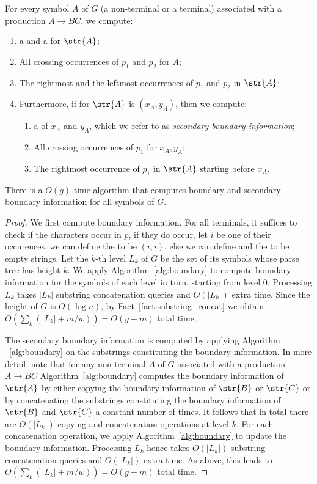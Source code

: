 For every symbol $A$ of $G$ (a non-terminal or a terminal) associated with a production $A\rightarrow BC$, we compute:
\begin{enumerate}
    \item a  and a  for $\str{A}$;
    \item All crossing occurrences of $p_1$ and $p_2$ for $A$;
    \item The rightmost and the leftmost occurrences of $p_1$ and $p_2$ in $\str{A}$;
    \item Furthermore, if  for $\str{A}$ is $(x_A,y_A)$, then we compute:
    \begin{enumerate}
    	\item a  of $x_A$ and $y_A$, which we refer to as \emph{secondary boundary information};
    	\item All crossing occurrences of $p_1$ for $x_A, y_A$;
    	\item The rightmost occurrence of $p_1$ in $\str{A}$ starting before $x_A$.
   	\end{enumerate}
\end{enumerate}

\begin{proposition}
There is a $O(g)$-time algorithm that computes boundary and secondary boundary information for all symbols of $G$.
\end{proposition}
\begin{proof}
We first compute boundary information. 
For all terminals, it suffices to check if the characters occur in $p$, if they do occur, let $i$ be one of their occurences, we can define the  to be $(i,i)$, else we can define  and the  to be empty strings.
%
Let the $k$-th level $L_k$ of $G$ be the set of its symbols whose parse tree has height $k$. We apply Algorithm~\ref{alg:boundary} to compute boundary information for the symbols of each level in turn, starting from level $0$. Processing $L_k$ takes $|L_k|$ substring concatenation queries and $O(|L_k|)$ extra time. Since the height of $G$ is $O(\log n)$, by Fact~\ref{fact:substring_concat} we obtain $O(\sum_{k} (|L_k| + m/w)) = O(g+m)$ total time. 

The secondary boundary information is computed by applying Algorithm ~\ref{alg:boundary} on the substrings constituting the boundary information. In more detail, note that for any non-terminal $A$ of $G$ associated with a production $A \rightarrow BC$ Algorithm~\ref{alg:boundary} computes the boundary information of $\str{A}$ by either copying the boundary information of $\str{B}$ or $\str{C}$ or by concatenating the substrings constituting the boundary information of $\str{B}$ and $\str{C}$ a constant number of times. It follows that in total there are $O(|L_k|)$ copying and concatenation operations at level $k$. For each concatenation operation, we apply Algorithm~\ref{alg:boundary} to update the boundary information. 
Processing $L_k$ hence takes $O(|L_k|)$ substring concatenation queries and $O(|L_k|)$ extra time. As above, this leads to  $O(\sum_{k} (|L_k| + m/w)) = O(g+m)$ total time. 

\end{proof}

